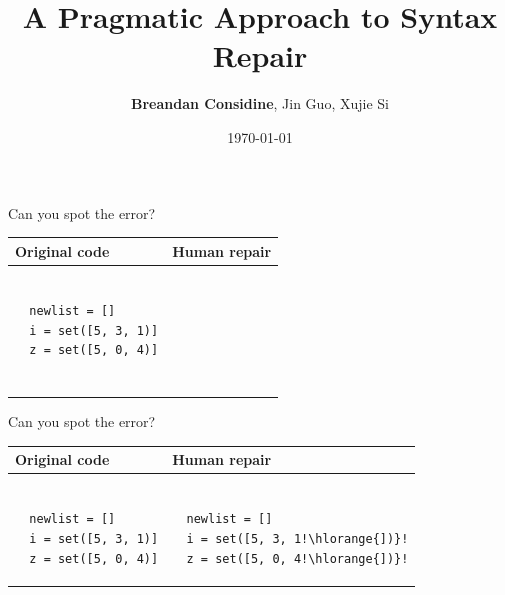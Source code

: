 \documentclass{beamer}
\title[A Pragmatic Approach to Syntax Repair]{A Pragmatic Approach to Syntax Repair}
\author[Considine, Guo, Si]{\textbf{Breandan Considine}, Jin Guo, Xujie Si}
\institute[McGill]{
  McGill University, Mila IQIA\\
  \medskip
  \textit{bre@ndan.co}
}
\date{\today}
\begin{document}
\begin{frame}
  \titlepage
\end{frame}


\begin{frame}[fragile]{Can you spot the error?}
  \begin{center}
    \begin{tabular}{|m{5.5cm}|m{5.5cm}|}
      \hline \rule{0pt}{2.5ex}\textbf{Original code}\rule[-1ex]{0pt}{2ex} &  \rule{0pt}{2.5ex}\textbf{Human repair}\rule[-1ex]{0pt}{2ex} \\\hline
      \begin{lstlisting}[escapechar=!, basicstyle=\linespread{1.3}\ttfamily\footnotesize]

  newlist = []
  i = set([5, 3, 1)]
  z = set([5, 0, 4)]


      \end{lstlisting} & \begin{lstlisting}[escapechar=!, basicstyle=\linespread{1.3}\ttfamily\footnotesize]

      \end{lstlisting} \\\hline
    \end{tabular}
  \end{center}
\end{frame}

\begin{frame}[fragile]{Can you spot the error?}
  \begin{center}
    \begin{tabular}{|m{5.5cm}|m{5.5cm}|}
      \hline \rule{0pt}{2.5ex}\textbf{Original code}\rule[-1ex]{0pt}{2ex} &  \rule{0pt}{2.5ex}\textbf{Human repair}\rule[-1ex]{0pt}{2ex} \\\hline
      \begin{lstlisting}[escapechar=!, basicstyle=\linespread{1.3}\ttfamily\footnotesize]

  newlist = []
  i = set([5, 3, 1)]
  z = set([5, 0, 4)]

      \end{lstlisting} & \begin{lstlisting}[escapechar=!, basicstyle=\linespread{1.3}\ttfamily\footnotesize]

  newlist = []
  i = set([5, 3, 1!\hlorange{])}!
  z = set([5, 0, 4!\hlorange{])}!

      \end{lstlisting} \\\hline
    \end{tabular}
  \end{center}
\end{frame}
\end{document}
